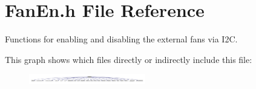 \hypertarget{a00016}{\section{Fan\-En.\-h File Reference}
\label{a00016}
}


Functions for enabling and disabling the external fans via I2\-C.  


This graph shows which files directly or indirectly include this file\-:
\nopagebreak
\begin{figure}[H]
\begin{center}
\leavevmode
\includegraphics[width=144pt]{a00047}
\end{center}
\end{figure}
